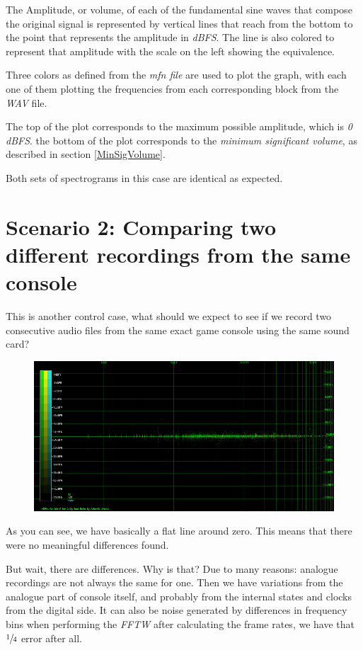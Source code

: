 \documentclass[10pt,a4paper]{report}
\begin{document}
The Amplitude, or volume, of each of the fundamental sine waves that compose the original signal is represented by vertical lines that reach from the bottom to the point that represents the amplitude in \textit{dBFS}\cite{dbfs}. The line is also colored to represent that amplitude with the scale on the left showing the equivalence.

Three colors as defined from the \textit{mfn file} are used to plot the graph, with each one of them plotting the frequencies from each corresponding block from the \textit{WAV} file.

The top of the plot corresponds to the maximum possible amplitude, which is \textit{0 dBFS}. the bottom of the plot corresponds to the \textit{minimum significant volume}, as described in section \ref*{MinSigVolume}.

Both sets of spectrograms in this case are identical as expected. 

\section{Scenario 2: Comparing two different recordings from the same console}

This is another control case, what should we expect to see if we record two consecutive audio files from the same exact game console using the same sound card?

\begin{figure}[H]
	\centering
	\includegraphics[width=1\linewidth]{plots/Plot2-Sameconsole}
	\caption{}
	\label{fig:plot2-sameconsole}
\end{figure}

As you can see, we have basically a flat line around zero. This means that there were no meaningful differences found. 

But wait, there are differences. Why is that? Due to many reasons: analogue recordings are not always the same for one. Then we have variations from the analogue part of console itself, and probably from the internal states and clocks from the digital side. It can also be noise generated by differences in frequency bins when performing the \textit{FFTW} after calculating the frame rates, we have that $\sfrac{1}{4}$ error after all.
\end{document}
